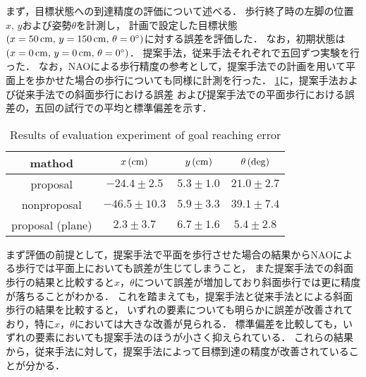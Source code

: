 \documentclass[autodetect-engine,dvipdfmx-if-dvi,ja=standard,a4j,jbase=11pt,magstyle=nomag*]{bxjsreport}
\begin{document}
まず，目標状態への到達精度の評価について述べる．
歩行終了時の左脚の位置$x ,\, y$および姿勢$\theta$を計測し，
計画で設定した目標状態$(x = 50\,\cm ,\, y = 150\,\cm ,\, \theta = 0\degree)$に対する誤差を評価した．
なお，初期状態は$(x = 0\,\cm ,\, y = 0\,\cm ,\, \theta = 0\degree)$．
提案手法，従来手法それぞれで五回ずつ実験を行った．
なお，NAOによる歩行精度の参考として，提案手法での計画を用いて平面上を歩かせた場合の歩行についても同様に計測を行った．
\cref{tab:result_goalerror}に，提案手法および従来手法での斜面歩行における誤差
および提案手法での平面歩行における誤差の，五回の試行での平均と標準偏差を示す．
\begin{table}[t]
    \caption{Results of evaluation experiment of goal reaching error}
    \label{tab:result_goalerror}
    \centering
    \begin{tabular}{cccc}%
        \toprule%
        mathod              &   $x\,(\si{\centi\meter})$          &   $y\,(\si{\centi\meter})$      &   $\theta\,(\mathrm{deg})$ \\%
        \midrule%
        proposal            &   $-24.4 \pm  2.5$    &   $5.3 \pm 1.0$   &   $21.0 \pm 2.7$ \\%
        nonproposal         &   $-46.5 \pm 10.3$    &   $5.9 \pm 3.3$   &   $39.1 \pm 7.4$ \\%
        \cmidrule{1-4}%
        proposal (plane)    &   $ 2.3 \pm  3.7$     &   $6.7 \pm 1.6$   &   $5.4 \pm 2.8$ \\%
        \bottomrule%
    \end{tabular}
\end{table}
まず評価の前提として，提案手法で平面を歩行させた場合の結果からNAOによる歩行では平面上においても誤差が生じてしまうこと，
また提案手法での斜面歩行の結果と比較すると$x$，$\theta$について誤差が増加しており斜面歩行では更に精度が落ちることがわかる．
これを踏まえても，提案手法と従来手法とによる斜面歩行の結果を比較すると，
いずれの要素についても明らかに誤差が改善されており，特に$x$，$\theta$においては大きな改善が見られる．
標準偏差を比較しても，いずれの要素においても提案手法のほうが小さく抑えられている．
これらの結果から，従来手法に対して，提案手法によって目標到達の精度が改善されていることが分かる．

\end{document}
